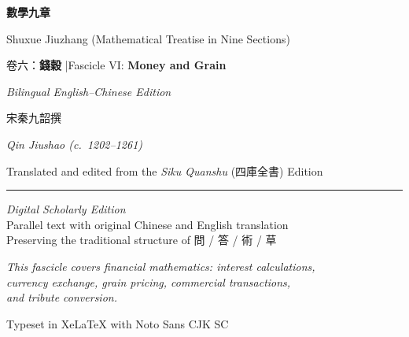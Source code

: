 \documentclass[11pt,a4paper]{article}
\begin{document}
\begin{titlepage}
\centering
\vspace*{2cm}

{\fontsize{32}{40}\selectfont\color{titlecolor}\textbf{數學九章}}

\vspace{0.8cm}

{\fontsize{16}{20}\selectfont\color{sectioncolor} Shuxue Jiuzhang (Mathematical Treatise in Nine Sections)}

\vspace{1.5cm}

{\Large\color{sectioncolor} 卷六：\textbf{錢穀} \enskip|\enskip Fascicle VI: \textbf{Money and Grain}}

\vspace{0.5cm}

{\large\color{notecolor}\textit{Bilingual English--Chinese Edition}}

\vspace{2.5cm}

{\large 宋\quad 秦九韶\quad 撰}

\vspace{0.3cm}

{\normalsize\textit{Qin Jiushao (c.\ 1202--1261)}}

\vspace{0.3cm}

{\small\color{sectioncolor} Translated and edited from the \textit{Siku Quanshu} (四庫全書) Edition}

\vspace{2.5cm}

{\color{rulecolor}\rule{0.55\textwidth}{0.4pt}}

\vspace{1.5cm}

{\small\color{sectioncolor}
\textit{Digital Scholarly Edition}\\[0.5em]
Parallel text with original Chinese and English translation\\[0.5em]
Preserving the traditional structure of 問 / 答 / 術 / 草}

\vspace{2cm}

{\small\color{notecolor}
\textit{This fascicle covers financial mathematics: interest calculations,}\\
\textit{currency exchange, grain pricing, commercial transactions,}\\
\textit{and tribute conversion.}
}

\vfill
{\small\color{sectioncolor} Typeset in XeLaTeX with Noto Sans CJK SC}
\end{titlepage}
\end{document}
